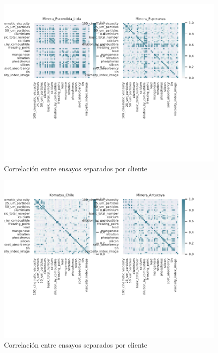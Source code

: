 \documentclass{article}
\begin{document}
\begin{figure}[!htbp]
\centering
\includegraphics[width=\textwidth]{figs/perclient1.pdf}
\vspace*{-30mm}
\caption{Correlaci\'on entre ensayos separados por cliente}
\label{fig:perclient1}
\end{figure}

\begin{figure}[!htbp]
\centering
\includegraphics[width=\textwidth]{figs/perclient2.pdf}
\vspace*{-30mm}
\caption{Correlaci\'on entre ensayos separados por cliente}
\label{fig:perclient2}
\end{figure}
\end{document}
